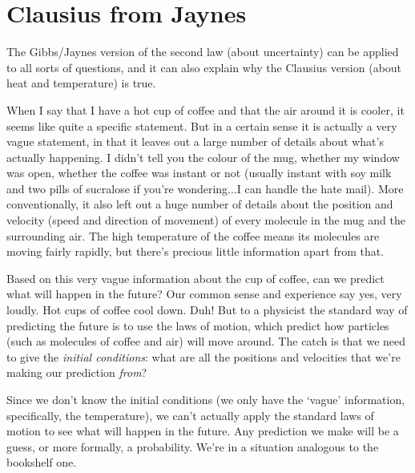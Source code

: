 \documentclass[a4paper, 12pt]{article}
\begin{document}

\section*{Clausius from Jaynes}
The Gibbs/Jaynes version of the second law (about uncertainty)
can be applied to all sorts of
questions, and it can also explain why the Clausius version (about heat and
temperature) is true. 

When I say that I have a hot cup of coffee and that the air around it is cooler,
it seems like quite a specific statement. But in a certain sense it is actually
a very vague statement, in that it leaves out a large number of details about
what's actually happening. I didn't tell you the colour of the mug, whether
my window was open, whether the coffee was instant or not (usually instant with
soy milk and two pills of sucralose if you're wondering...I can handle the hate mail). More conventionally, it also left out a huge number of details about the position and
velocity (speed and direction of movement) of every molecule in the mug and
the surrounding air. The high temperature of the coffee means its
molecules are moving fairly rapidly, but there's precious little information
apart from that.

Based on this very vague information about the cup of coffee, can we predict
what will happen in the future? Our common sense and experience say yes, very
loudly. Hot cups of coffee cool down. Duh!
But to a physicist the standard way of predicting the future is to use
the laws of motion, which predict how particles (such as molecules of coffee
and air) will move around. The catch is that we need to give the {\it initial
conditions}: what are all the positions and velocities that we're making our
prediction {\it from}?

Since we don't know the initial conditions (we only have the `vague' information, specifically, the temperature), we can't actually apply the standard laws of motion to
see what will happen in the future. Any prediction we make will be a
guess, or more formally, a probability. We're in a situation analogous to the
bookshelf one. 
\end{document}
